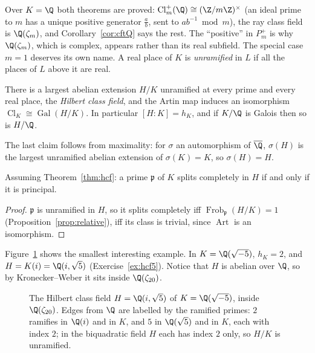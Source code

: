 Over $K=\Q$ both theorems are proved: $\mathrm{Cl}_m^+(\Q)\cong(\Z/m\Z)^\times$ (an ideal prime to $m$ has a unique positive generator $\frac ab$, sent to
$ab^{-1}\bmod m$), the ray class field is $\Q(\zeta_m)$, and Corollary~\ref{cor:cftQ} says the rest. The ``positive'' in $P_m^+$ is why $\Q(\zeta_m)$,
which is complex, appears rather than its real subfield. The special case $m=1$ deserves its own name. A real place of $K$ is \emph{unramified} in $L$
if all the places of $L$ above it are real.

\begin{theorem}\label{thm:hcf}
There is a largest abelian extension $H/K$ unramified at every prime and every real place, the \emph{Hilbert class field}, and the Artin map induces
an isomorphism $\operatorname{Cl}_K\cong\operatorname{Gal}(H/K)$. In particular $[H:K]=h_K$, and if $K/\Q$ is Galois then so is $H/\Q$.
\end{theorem}

The last claim follows from maximality: for $\sigma$ an automorphism of $\overline{\Q}$, $\sigma(H)$ is the largest unramified abelian extension of
$\sigma(K)=K$, so $\sigma(H)=H$.

\begin{corollary}\label{cor:principalsplit}
Assuming Theorem~\ref{thm:hcf}: a prime $\mathfrak p$ of $K$ splits completely in $H$ if and only if it is principal.
\end{corollary}
\begin{proof}
$\mathfrak p$ is unramified in $H$, so it splits completely iff $\operatorname{Frob}_{\mathfrak p}(H/K)=1$ (Proposition~\ref{prop:relative}), iff its class is
trivial, since $\operatorname{Art}$ is an isomorphism.
\end{proof}

Figure~\ref{fig:tower} shows the smallest interesting example. In $K=\Q(\sqrt{-5})$, $h_K=2$, and $H=K(i)=\Q(i,\sqrt5)$
(Exercise~\ref{ex:hcf5}). Notice that $H$ is abelian over $\Q$, so by Kronecker--Weber it sits inside $\Q(\zeta_{20})$.

\begin{figure}[ht]
\centering
{}
\caption{The Hilbert class field $H=\Q(i,\sqrt5)$ of $K=\Q(\sqrt{-5})$, inside $\Q(\zeta_{20})$. Edges from $\Q$ are labelled by the ramified primes: $2$ ramifies in $\Q(i)$ and
in $K$, and $5$ in $\Q(\sqrt5)$ and in $K$, each with index $2$; in the biquadratic field $H$ each has index $2$ only, so $H/K$ is
unramified.}
\label{fig:tower}
\end{figure}

